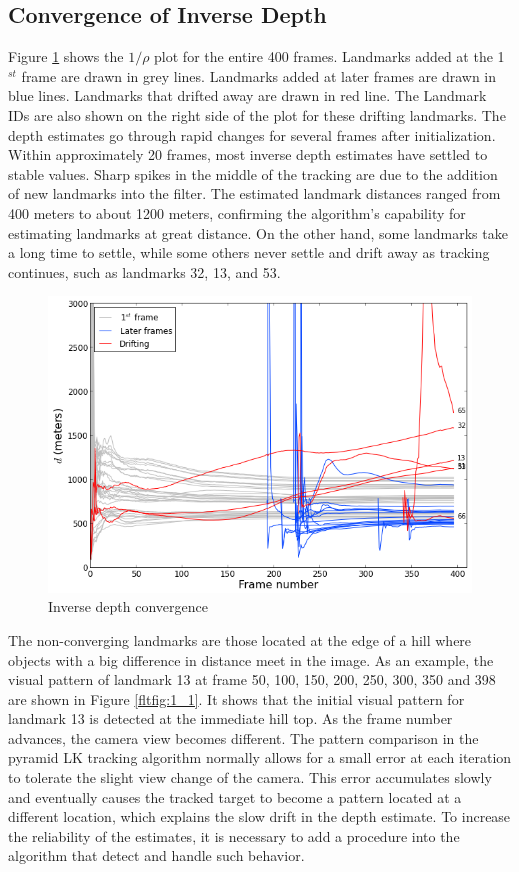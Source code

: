 \subsection{Convergence of Inverse Depth}
Figure \ref{fltfig:1} shows the $1/\rho$ plot for the entire 400
frames. Landmarks added at the 1$^{st}$ frame are drawn in grey lines.
Landmarks added at later frames are drawn in blue lines. Landmarks
that drifted away are drawn in red line. The Landmark IDs are also
shown on the right side of the plot for these drifting landmarks. The depth
estimates go through rapid changes for several frames after
initialization. Within approximately 20 frames, most inverse depth
estimates have settled to stable values. Sharp spikes in the middle of
the tracking are due to the addition of new landmarks into the filter.
The estimated landmark distances ranged from 400 meters to about 1200
meters, confirming the algorithm's capability for estimating landmarks
at great distance. On the other hand, some landmarks take a long time
to settle, while some others never settle and drift away as tracking
continues, such as landmarks 32, 13, and 53.

\begin{figure}[h]
\centering
\includegraphics[width=12cm, keepaspectratio=true]{./Figures/fltfig/cut1/Figure131.png}
\caption{Inverse depth convergence}
\label{fltfig:1}
\end{figure}

The non-converging landmarks are those located at the edge of a hill
where objects with a big difference in distance meet in the image. As
an example, the visual pattern of landmark 13 at frame 50, 100, 150,
200, 250, 300, 350 and 398 are shown in Figure \ref{fltfig:1_1}. It
shows that the initial visual pattern for landmark 13 is detected at
the immediate hill top. As the frame number advances, the camera view
becomes different. The pattern comparison in the pyramid LK tracking
algorithm normally allows for a small error at each iteration to
tolerate the slight view change of the camera. This error accumulates
slowly and eventually causes the tracked target to become a pattern
located at a different location, which explains the slow drift in the
depth estimate. To increase the reliability of the estimates, it is
necessary to add a procedure into the algorithm that detect and handle
such behavior.

